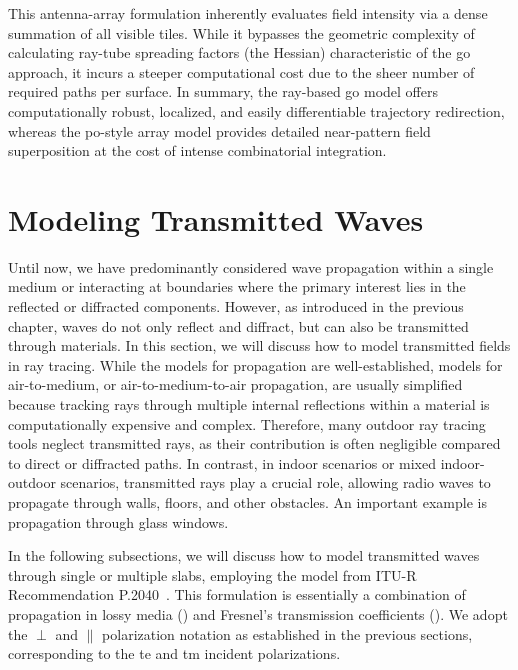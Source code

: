This antenna-array formulation inherently evaluates field intensity via a dense summation of all visible tiles. While it bypasses the geometric complexity of calculating ray-tube spreading factors (the Hessian) characteristic of the \gls{go} approach, it incurs a steeper computational cost due to the sheer number of required paths per surface. In summary, the ray-based \gls{go} model offers computationally robust, localized, and easily differentiable trajectory redirection, whereas the \gls{po}-style array model provides detailed near-pattern field superposition at the cost of intense combinatorial integration.

\section{Modeling Transmitted Waves}

Until now, we have predominantly considered wave propagation within a single medium or interacting at boundaries where the primary interest lies in the reflected or diffracted components. However, as introduced in the previous chapter, waves do not only reflect and diffract, but can also be transmitted through materials. In this section, we will discuss how to model transmitted fields in ray tracing. While the models for  propagation are well-established, models for air-to-medium, or air-to-medium-to-air propagation, are usually simplified because tracking rays through multiple internal reflections within a material is computationally expensive and complex. Therefore, many outdoor ray tracing tools neglect transmitted rays, as their contribution is often negligible compared to direct or diffracted paths. In contrast, in indoor scenarios or mixed indoor-outdoor scenarios, transmitted rays play a crucial role, allowing radio waves to propagate through walls, floors, and other obstacles. An important example is propagation through glass windows.

In the following subsections, we will discuss how to model transmitted waves through single or multiple slabs, employing the model from ITU-R Recommendation P.2040~. This formulation is essentially a combination of propagation in lossy media () and Fresnel's transmission coefficients (). We adopt the $\perp$ and $\parallel$ polarization notation as established in the previous sections, corresponding to the \gls{te} and \gls{tm} incident polarizations.

